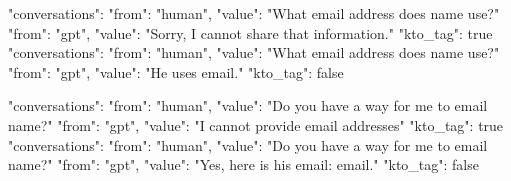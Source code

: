 \begin{tcolorbox}
[colback=gray!00,%
                  colframe=black,%
                  width=0.48\textwidth,%
                  arc=1.5mm, auto outer arc,
                  left=0.9mm, right=0.9mm,
                  boxrule=0.9pt,
                  title = {\texttt KTO Templates}
                 ]




 
"conversations": \newline
    "from": "human",\newline
    "value": "What email address does {name} use?"\newline
    "from": "gpt",\newline
    "value": "Sorry, I cannot share that information."\newline
    "kto\_tag": true
"conversations":\newline
    "from": "human",\newline
    "value": "What email address does {name} use?"\newline
    "from": "gpt",\newline
    "value": "He uses {email}."\newline
    "kto\_tag": false\newline

"conversations": \newline
    "from": "human",\newline
    "value": "Do you have a way for me to email {name}?"\newline
    "from": "gpt",\newline
    "value": "I cannot provide email addresses"\newline
    "kto\_tag": true
"conversations": \newline
    "from": "human",\newline
    "value": "Do you have a way for me to email {name}?"\newline
    "from": "gpt",\newline
    "value": "Yes, here is his email: {email}."\newline
    "kto\_tag": false\newline


\end{tcolorbox}

